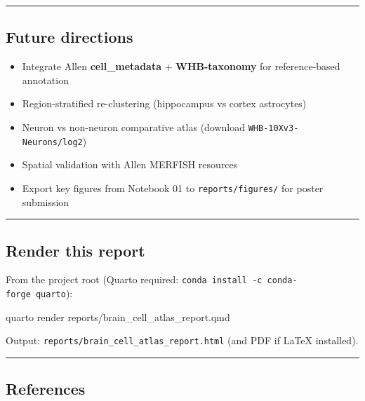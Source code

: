 \documentclass[
  11pt,
]{article}
\newenvironment{Shaded}{\begin{snugshade}}{\end{snugshade}}
\newcommand{\ExtensionTok}[1]{\textcolor[rgb]{0.00,0.23,0.31}{#1}}
\newcommand{\NormalTok}[1]{\textcolor[rgb]{0.00,0.23,0.31}{#1}}
\providecommand{\tightlist}{%
  \setlength{\itemsep}{0pt}\setlength{\parskip}{0pt}}
\begin{document}
\begin{center}\rule{0.5\linewidth}{0.5pt}\end{center}

\subsection{Future directions}\label{future-directions}

\begin{itemize}
\tightlist
\item
  Integrate Allen \textbf{cell\_metadata} + \textbf{WHB-taxonomy} for
  reference-based annotation
\item
  Region-stratified re-clustering (hippocampus vs cortex astrocytes)
\item
  Neuron vs non-neuron comparative atlas (download
  \texttt{WHB-10Xv3-Neurons/log2})
\item
  Spatial validation with Allen MERFISH resources
\item
  Export key figures from Notebook 01 to \texttt{reports/figures/} for
  poster submission
\end{itemize}

\begin{center}\rule{0.5\linewidth}{0.5pt}\end{center}

\subsection{Render this report}\label{render-this-report}

From the project root (Quarto required:
\texttt{conda\ install\ -c\ conda-forge\ quarto}):

\begin{Shaded}
\begin{Highlighting}[]
\ExtensionTok{quarto}\NormalTok{ render reports/brain\_cell\_atlas\_report.qmd}
\end{Highlighting}
\end{Shaded}

Output: \texttt{reports/brain\_cell\_atlas\_report.html} (and PDF if
LaTeX installed).

\begin{center}\rule{0.5\linewidth}{0.5pt}\end{center}

\subsection{References}\label{references}
\end{document}
